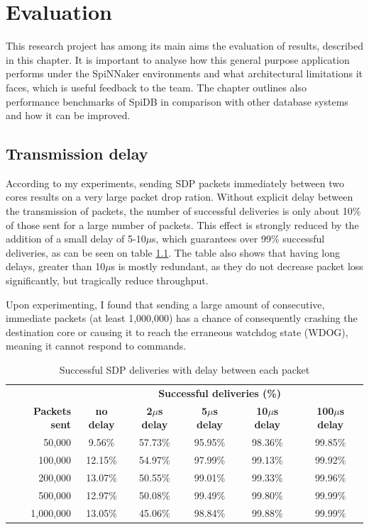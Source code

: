 \chapter{Evaluation}
\label{cha:eval}
This research project has among its main aims the evaluation of results, described in this chapter. It is important to analyse how this general purpose application performs under the SpiNNaker environments and what architectural limitations it faces, which is useful feedback to the team. The chapter outlines also performance benchmarks of SpiDB in comparison with other database systems and how it can be improved.

\section{Transmission delay}
\label{sec:eval_comm_rel}

According to my experiments, sending SDP packets immediately between two cores results on a very large packet drop ration. Without explicit delay between the transmission of packets, the number of successful deliveries is only about 10\% of those sent for a large number of packets. This effect is strongly reduced by the addition of a small delay of 5-10$\mu$s, which guarantees over 99\% successful deliveries, as can be seen on table \ref{table:sdp_deliveries}. The table also shows that having long delays, greater than 10$\mu$s is mostly redundant, as they do not decrease packet loss significantly, but tragically reduce throughput.

Upon experimenting, I found that sending a large amount of consecutive, immediate packets (at least 1,000,000) has a chance of consequently crashing the destination core or causing it to reach the erraneous watchdog state (WDOG), meaning it cannot respond to commands.

\begin{table}
\begin{tabular}{ r | c | c | c | c | c }
 & \multicolumn{5}{c}{\textbf{Successful deliveries (\%)}} \\

\textbf{Packets sent} & \textbf{no delay} & \textbf{2$\mu$s delay} & \textbf{5$\mu$s delay} & \textbf{10$\mu$s delay} & \textbf{100$\mu$s delay} \\
50,000 & 9.56\% & 57.73\% & 95.95\% & 98.36\% & 99.85\% \\
100,000 & 12.15\% & 54.97\% & 97.99\% & 99.13\% & 99.92\% \\
200,000 & 13.07\% & 50.55\% & 99.01\% & 99.33\% & 99.96\% \\
500,000 & 12.97\% & 50.08\% & 99.49\% & 99.80\% & 99.99\% \\
1,000,000 & 13.05\% & 45.06\% & 98.84\% & 99.88\% & 99.99\% \\
\end{tabular}
\caption{Successful SDP deliveries with delay between each packet}
\label{table:sdp_deliveries}
\end{table}


